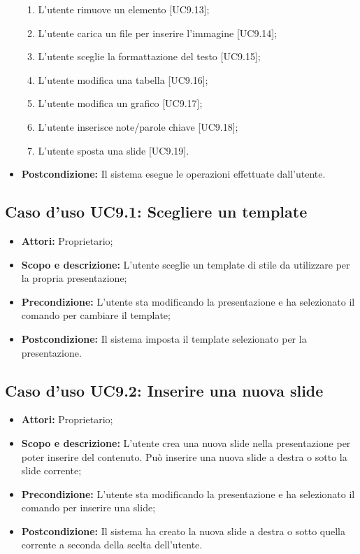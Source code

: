 \begin{itemize}
\begin{enumerate}
		\item L'utente rimuove un elemento [UC9.13];

		\item L'utente carica un file per inserire l'immagine [UC9.14];

		\item L'utente sceglie la formattazione del testo [UC9.15];

		\item L'utente modifica una tabella [UC9.16];

		\item L'utente modifica un grafico [UC9.17];
		
		\item L'utente inserisce note/parole chiave [UC9.18];
		
		\item L'utente sposta una \gls{slide} [UC9.19].
	\end{enumerate}
	\item \textbf{Postcondizione:} Il sistema esegue le operazioni effettuate dall'utente.
\end{itemize}


\subsection{Caso d'uso UC9.1: Scegliere un template}
\begin{itemize}
	\item \textbf{Attori:} Proprietario;
	\item \textbf{Scopo e descrizione:} L'utente sceglie un \gls{template} di stile da utilizzare per la propria presentazione;
	\item \textbf{Precondizione:} L'utente sta modificando la presentazione e ha selezionato il comando per cambiare il \gls{template};
	\item \textbf{Postcondizione:} Il sistema imposta il \gls{template} selezionato per la presentazione.
\end{itemize}


\subsection{Caso d'uso UC9.2: Inserire una nuova slide}
\begin{itemize}
	\item \textbf{Attori:} Proprietario;
	\item \textbf{Scopo e descrizione:} L'utente crea una nuova \gls{slide} nella presentazione per poter inserire del contenuto. Può inserire una nuova \gls{slide} a destra o sotto la \gls{slide} corrente;
	\item \textbf{Precondizione:} L'utente sta modificando la presentazione e ha selezionato il comando per inserire una \gls{slide};
	\item \textbf{Postcondizione:} Il sistema ha creato la nuova \gls{slide} a destra o sotto quella corrente a seconda della scelta dell'utente.
\end{itemize}


